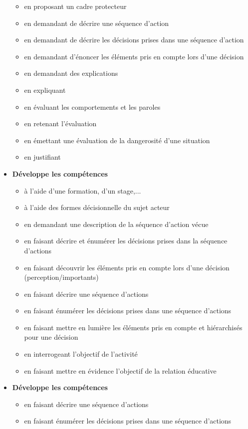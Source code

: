 \documentclass[8pt,a4paper]{article}
\begin{document}
\begin{itemize}
\begin{itemize}
\item en proposant un cadre protecteur
\item en demandant de décrire une séquence d'action
\item en demandant de décrire les décisions prises dans une séquence d'action
\item en demandant d'énoncer les éléments pris en compte lors d'une décision
\item en demandant des explications
\item en expliquant
\item en évaluant les comportements et les paroles
\item en retenant l'évaluation
\item en émettant une évaluation de la dangerosité d'une situation
\item en justifiant
\\ 
 \end{itemize}
\item \textbf{Développe les compétences}
\begin{itemize}
\item à l'aide d'une formation, d'un stage,...
\item à l'aide des formes décisionnelle du sujet acteur
\item en demandant une description de la séquence d'action vécue
\item en faisant décrire et énumérer les décisions prises dans la séquence d'actions
\item en faisant découvrir les éléments pris en compte lors d'une décision (perception/importants)
\item en faisant décrire une séquence d'actions
\item en faisant énumérer les décisions prises dans une séquence d'actions
\item en faisant mettre en lumière les éléments pris en compte et hiérarchisés pour une décision 
\item en interrogeant l'objectif de l'activité
\item en faisant mettre en évidence l'objectif de la relation éducative
\\ 
 \end{itemize}
\item \textbf{Développe les compétences}
\begin{itemize}
\item en faisant décrire une séquence d'actions
\item en faisant énumérer les décisions prises dans une séquence d'actions

\end{itemize}
\end{itemize}
\end{document}
